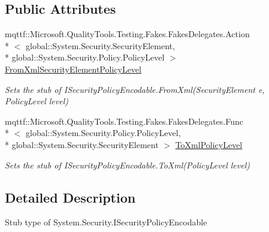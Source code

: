 \subsection*{Public Attributes}
\begin{DoxyCompactItemize}
\item 
mqttf\-::\-Microsoft.\-Quality\-Tools.\-Testing.\-Fakes.\-Fakes\-Delegates.\-Action\\*
$<$ global\-::\-System.\-Security.\-Security\-Element, \\*
global\-::\-System.\-Security.\-Policy.\-Policy\-Level $>$ \hyperlink{class_system_1_1_security_1_1_fakes_1_1_stub_i_security_policy_encodable_ac321dc6952360ac36747522bd7abc312}{From\-Xml\-Security\-Element\-Policy\-Level}
\begin{DoxyCompactList}\small\item\em Sets the stub of I\-Security\-Policy\-Encodable.\-From\-Xml(\-Security\-Element e, Policy\-Level level)\end{DoxyCompactList}\item 
mqttf\-::\-Microsoft.\-Quality\-Tools.\-Testing.\-Fakes.\-Fakes\-Delegates.\-Func\\*
$<$ global\-::\-System.\-Security.\-Policy.\-Policy\-Level, \\*
global\-::\-System.\-Security.\-Security\-Element $>$ \hyperlink{class_system_1_1_security_1_1_fakes_1_1_stub_i_security_policy_encodable_a65f71cfea7d80d838ff2425d73ca8ee1}{To\-Xml\-Policy\-Level}
\begin{DoxyCompactList}\small\item\em Sets the stub of I\-Security\-Policy\-Encodable.\-To\-Xml(\-Policy\-Level level)\end{DoxyCompactList}\end{DoxyCompactItemize}


\subsection{Detailed Description}
Stub type of System.\-Security.\-I\-Security\-Policy\-Encodable



